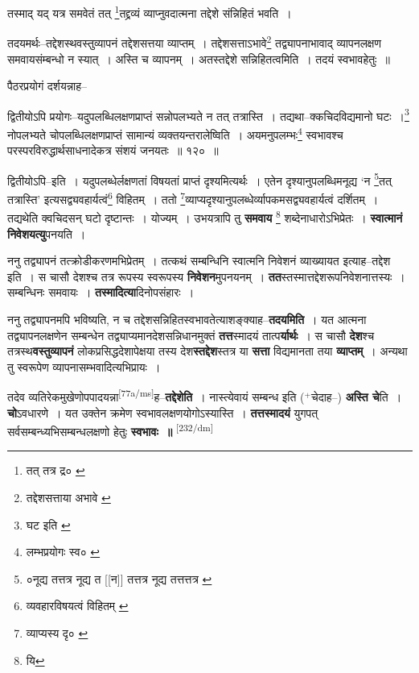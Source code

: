 \documentclass[article,12pt,a4paper]{memoir}
\newcommand{\add}[1]{($^{+}$#1)}
\begin{document}
	तस्माद् यद् यत्र समवेतं तत् \footnote{तत् तत्र द्र० \cite{dp-edE}}तद्द्रव्यं व्याप्नुवदात्मना तद्देशे संन्निहितं भवति । 
	  
	तदयमर्थः--तद्देशस्थवस्तुव्यापनं तद्देशसत्तया व्याप्तम् । तद्देशसत्ताऽभावे\footnote{तद्देशसत्ताया अभावे \cite{dp-msB} \cite{dp-msC}} तद्व्यापनाभावाद् व्यापनलक्षण समवायसंम्बन्धो न स्यात् । अस्ति च व्यापनम् । अतस्तद्देशे सन्निहितत्वमिति । तदयं स्वभावहेतुः ॥ 
	  
	पैठरप्रयोगं दर्शयन्नाह-- 
	  
	द्वितीयोऽपि प्रयोगः--यदुपलब्धिलक्षणप्राप्तं सन्नोपलभ्यते न तत् तत्रास्ति । तद्यथा--क्कचिदविद्यमानो घटः ।\footnote{घट इति \cite{dp-msC}} नोपलभ्यते चोपलब्धिलक्षणप्राप्तं सामान्यं व्यक्तयन्तरालेष्विति । अयमनुपलम्भः\footnote{लम्भप्रयोगः स्व० \cite{dp-msD} \cite{dp-msB} \cite{dp-edP} \cite{dp-edH} \cite{dp-edE} \cite{dp-edN}} स्वभावश्च परस्परविरुद्धार्थसाधनादेकत्र संशयं जनयतः ॥ १२० ॥ 
	  
	द्वितीयोऽपि--इति । यदुपलब्धेर्लक्षणतां विषयतां प्राप्तं दृश्यमित्यर्थः । एतेन दृश्यानुपलब्धिमनूद्य ‘न \footnote{०नूद्य तत्तत्र \cite{dp-msB} नूद्य त [[न]] तत्तत्र \cite{dp-msA} नूद्य तत्तत्तत्र \cite{dp-edP} \cite{dp-edH}}तत् तत्रास्ति’ इत्यसद्व्यवहार्यत्वं\footnote{व्यवहारविषयत्वं विहितम् \cite{dp-msD}} विहितम् । ततो \footnote{व्याप्यस्य दृ० \cite{dp-edE}}व्याप्यदृश्यानुपलब्धेर्व्यापकमसद्व्यवहार्यत्वं दर्शितम् । तद्यथेति क्वचिदसन् घटो दृष्टान्तः । योज्यम् । उभयत्रापि तु \textbf{समवाय} \footnote{यि} शब्देनाधारोऽभिप्रेतः । \textbf{स्वात्मानं निवेशयत्यु}पनयति ।
	\pend
      

	  \pstart ननु तद्व्यापनं तत्क्रोडीकरणमभिप्रेतम् । तत्कथं सम्बन्धिनि स्वात्मनि निवेशनं व्याख्यायत इत्याह--तद्देश इति । स चासौ देशश्च तत्र रूपस्य स्वरूपस्य \textbf{निवेशन}मुपनयनम् । \textbf{तत}स्तस्मात्तद्देशरूपनिवेशनात्तस्यः । सम्बन्धिनः समवायः । \textbf{तस्मादित्या}दिनोपसंहारः ।
	\pend
      

	  \pstart ननु तद्व्यापनमपि भविष्यति, न च तद्देशसन्निहितस्वभावतेत्याशङ्क्याह--\textbf{तदयमिति} । यत आत्मना तद्व्यापनलक्षणेन सम्बन्धेन तद्व्याप्यमानदेशसन्निधानमुक्तं \textbf{तत्त}स्मादयं तात्प\textbf{र्यार्थः} । स चासौ \textbf{देश}श्च तत्रस्थ\textbf{वस्तुव्यापनं} लोकप्रसिद्धदेशापेक्षया तस्य देश\textbf{स्तद्देश}स्तत्र या \textbf{सत्ता} विद्यमानता तया \textbf{व्याप्तम्} । अन्यथा तु स्वरूपेण व्यापनासम्भवादित्यभिप्रायः ।
	\pend
      

	  \pstart तदेव व्यतिरेकमुखेणोपपादयन्ना\leavevmode\textsuperscript{\rmlatinfont\tiny [77a/ms]}ह--\textbf{तद्देशेति} । नास्त्येवायं सम्बन्ध इति \add{चेदाह--} \textbf{अस्ति चे}ति । \textbf{चो}ऽवधारणे । यत उक्तेन क्रमेण स्वभावलक्षणयोगोऽस्यास्ति । \textbf{तत्तस्मादयं} युगपत् सर्वसम्बन्ध्यभिसम्बन्धलक्षणो हेतुः \textbf{स्वभावः ॥}
	\pend
      \leavevmode\textsuperscript{\rmlatinfont\tiny [232/dm]}
\end{document}
